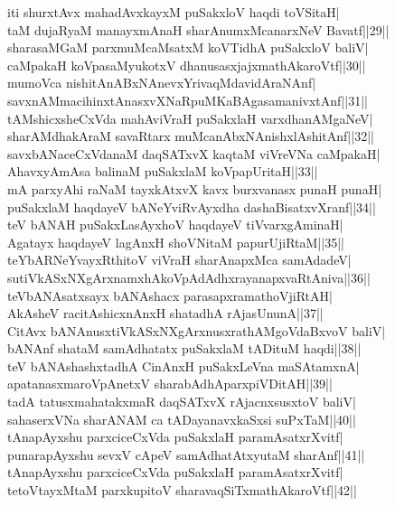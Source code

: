 \documentclass{article}
\begin{document}
iti shurxtAvx mahadAvxkayxM puSakxloV haqdi toVSitaH|\\
taM dujaRyaM manayxmAnaH sharAnumxMcanarxNeV Bavatf||29||\\
sharasaMGaM parxmuMcaMsatxM koVTidhA puSakxloV baliV|\\
caMpakaH koVpasaMyukotxV dhanusasxjajxmathAkaroVtf||30||\\
mumoVca nishitAnABxNAnevxYrivaqMdavidAraNAnf|\\
savxnAMmacihinxtAnasxvXNaRpuMKaBAgasamanivxtAnf||31||\\
tAMshicxsheCxVda mahAviVraH puSakxlaH varxdhanAMgaNeV|\\
sharAMdhakAraM savaRtarx muMcanAbxNAnishxlAshitAnf||32||\\
savxbANaceCxVdanaM daqSATxvX kaqtaM viVreVNa caMpakaH|\\
AhavxyAmAsa balinaM puSakxlaM koVpapUritaH||33||\\
mA parxyAhi raNaM tayxkAtxvX kavx burxvanasx punaH punaH|\\
puSakxlaM haqdayeV bANeYviRvAyxdha dashaBisatxvXranf||34||\\
teV bANAH puSakxLasAyxhoV haqdayeV tiVvarxgAminaH|\\
Agatayx haqdayeV lagAnxH shoVNitaM papurUjiRtaM||35||\\
teYbARNeYvayxRthitoV viVraH sharAnapxMca samAdadeV|\\
sutiVkASxNXgArxnamxhAkoVpAdAdhxrayanapxvaRtAniva||36||\\
teVbANAsatxsayx bANAshacx parasapxramathoVjiRtAH|\\
AkAsheV racitAshicxnAnxH shatadhA rAjasUnunA||37||\\
CitAvx bANAnusxtiVkASxNXgArxnusxrathAMgoVdaBxvoV baliV|\\
bANAnf shataM samAdhatatx puSakxlaM tADituM haqdi||38||\\
teV bANAshashxtadhA CinAnxH puSakxLeVna maSAtamxnA|\\
apatanasxmaroVpAnetxV sharabAdhAparxpiVDitAH||39||\\
tadA tatusxmahatakxmaR daqSATxvX rAjacnxsusxtoV baliV|\\
sahaserxVNa sharANAM ca tADayanavxkaSxsi suPxTaM||40||\\
tAnapAyxshu parxciceCxVda puSakxlaH paramAsatxrXvitf|\\
punarapAyxshu sevxV cApeV samAdhatAtxyutaM sharAnf||41||\\
tAnapAyxshu parxciceCxVda puSakxlaH paramAsatxrXvitf|\\
tetoVtayxMtaM parxkupitoV sharavaqSiTxmathAkaroVtf||42||\\
\end{document}
